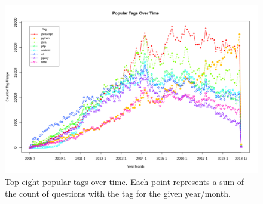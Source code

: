 \documentclass[a4paper,11pt, notitlepage]{report}
\theoremstyle{definition}
\numberwithin{equation}{section}		%
\begin{document}
\begin{figure}[ht]
    \centering
    \includegraphics[angle=270,width=5.5in]{figures/popular_tags_over_time.png}
    \caption{Top eight popular tags over time. Each point represents a sum of the count of questions with the tag for the given year/month.}
    \label{fig:popular-tags-over-time}
\end{figure}



\end{document}
